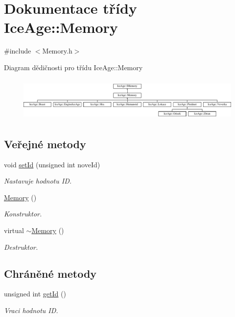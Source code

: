 \hypertarget{classIceAge_1_1Memory}{}\section{Dokumentace třídy Ice\+Age\+:\+:Memory}
\label{classIceAge_1_1Memory}


{\ttfamily \#include $<$Memory.\+h$>$}

Diagram dědičnosti pro třídu Ice\+Age\+:\+:Memory\begin{figure}[H]
\begin{center}
\leavevmode
\includegraphics[height=2.206897cm]{d0/d1c/classIceAge_1_1Memory}
\end{center}
\end{figure}
\subsection*{Veřejné metody}
\begin{DoxyCompactItemize}
\item 
void \hyperlink{classIceAge_1_1Memory_aeea129a4caa3506bbfa5287a4f61fc90}{set\+Id} (unsigned int nove\+Id)
\begin{DoxyCompactList}\small\item\em Nastavuje hodnotu ID. \end{DoxyCompactList}\item 
\hyperlink{classIceAge_1_1Memory_ae81d5a52a6b6d8f25e36689126b0d0c9}{Memory} ()
\begin{DoxyCompactList}\small\item\em Konstruktor. \end{DoxyCompactList}\item 
virtual \hyperlink{classIceAge_1_1Memory_ae2163982f0e32013f5b992c47752b5fd}{$\sim$\+Memory} ()
\begin{DoxyCompactList}\small\item\em Destruktor. \end{DoxyCompactList}\end{DoxyCompactItemize}
\subsection*{Chráněné metody}
\begin{DoxyCompactItemize}
\item 
unsigned int \hyperlink{classIceAge_1_1Memory_ac8f0e51954a707e4653b7f8a1af5fac1}{get\+Id} ()
\begin{DoxyCompactList}\small\item\em Vraci hodnotu ID. \end{DoxyCompactList}\end{DoxyCompactItemize}
